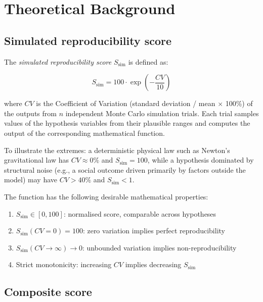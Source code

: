 \documentclass[12pt,a4paper]{article}
\begin{document}
\section{Theoretical Background}

\subsection{Simulated reproducibility score}

The \textit{simulated reproducibility score} $S_{\text{sim}}$ is defined as:

\begin{equation}
  S_{\text{sim}} = 100 \cdot \exp\!\left(-\frac{CV}{10}\right)
  \label{eq:ssim}
\end{equation}

where $CV$ is the Coefficient of Variation (standard deviation / mean $\times$ 100\%)
of the outputs from $n$ independent Monte Carlo simulation trials. Each trial
samples values of the hypothesis variables from their plausible ranges and
computes the output of the corresponding mathematical function.

To illustrate the extremes: a deterministic physical law such as Newton's
gravitational law has $CV \approx 0\%$ and $S_{\text{sim}} = 100$, while a hypothesis
dominated by structural noise (e.g., a social outcome driven primarily by
factors outside the model) may have $CV > 40\%$ and $S_{\text{sim}} < 1$.

The function has the following desirable mathematical properties:

\begin{enumerate}[leftmargin=2em]
  \item $S_{\text{sim}} \in [0, 100]$: normalised score, comparable across hypotheses
  \item $S_{\text{sim}}(CV=0) = 100$: zero variation implies perfect reproducibility
  \item $S_{\text{sim}}(CV \to \infty) \to 0$: unbounded variation implies non-reproducibility
  \item Strict monotonicity: increasing $CV$ implies decreasing $S_{\text{sim}}$
\end{enumerate}

\subsection{Composite score}
\end{document}
